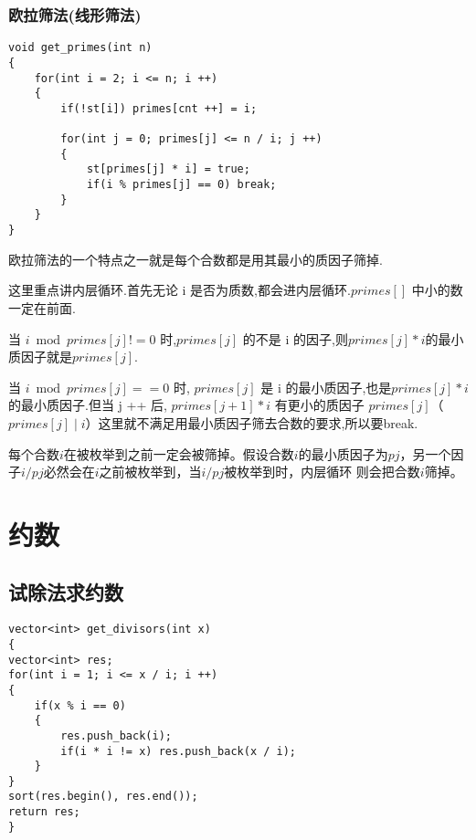 \documentclass[]{book}
\begin{document}
\subsection{欧拉筛法(线形筛法)}

\begin{lstlisting}
void get_primes(int n)
{
    for(int i = 2; i <= n; i ++)
    {
        if(!st[i]) primes[cnt ++] = i;
        
        for(int j = 0; primes[j] <= n / i; j ++)
        {
            st[primes[j] * i] = true;
            if(i % primes[j] == 0) break;
        }
    }
}
\end{lstlisting}

欧拉筛法的一个特点之一就是每个合数都是用其最小的质因子筛掉.

这里重点讲内层循环.首先无论 i 是否为质数,都会进内层循环.$primes[]$ 中小的数一定在前面.

当 $i \bmod primes[j] != 0$ 时,$primes[j]$ 的不是 i 的因子,则$primes[j] * i$的最小质因子就是$primes[j]$.

当 $i \bmod primes[j] == 0$ 时, $primes[j]$ 是 i 的最小质因子,也是$primes[j] * i$的最小质因子.但当 j ++ 后,
$primes[j + 1] * i$ 有更小的质因子 $primes[j]$（$primes[j] \mid i$）这里就不满足用最小质因子筛去合数的要求,所以要break.

每个合数$i$在被枚举到之前一定会被筛掉。假设合数$i$的最小质因子为$pj$，另一个因子$i/pj$必然会在$i$之前被枚举到，当$i/pj$被枚举到时，内层循环
则会把合数$i$筛掉。
\chapter{约数}
\section{试除法求约数}
\begin{lstlisting}
vector<int> get_divisors(int x)
{
vector<int> res;
for(int i = 1; i <= x / i; i ++)
{
    if(x % i == 0)
    {
        res.push_back(i);
        if(i * i != x) res.push_back(x / i);
    }
}
sort(res.begin(), res.end());
return res;
}
\end{lstlisting}
\end{document}
